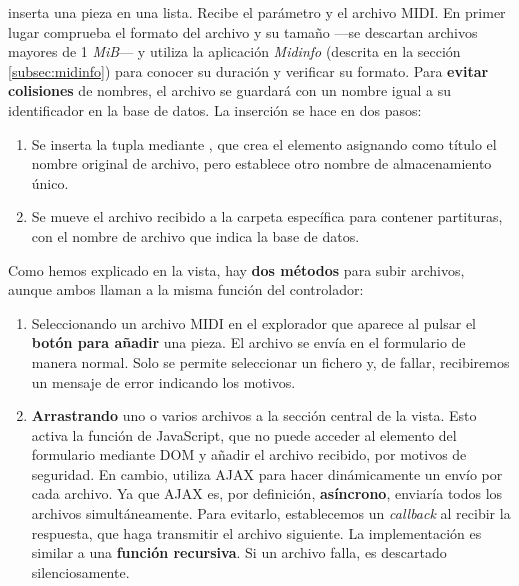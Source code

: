  inserta una pieza en una lista. Recibe el parámetro  y el archivo \acrshort{MIDI}. En primer lugar comprueba el formato del archivo y su tamaño ---se descartan archivos mayores de 1 \textit{MiB}--- y utiliza la aplicación \textit{Midinfo} (descrita en la sección \ref{subsec:midinfo}) para conocer su duración y verificar su formato. Para \textbf{evitar colisiones} de nombres, el archivo se guardará con un nombre igual a su identificador en la base de datos. La inserción se hace en dos pasos:

\begin{enumerate}
	\item Se inserta la tupla mediante , que crea el elemento asignando como título el nombre original de archivo, pero establece otro nombre de almacenamiento único.
	
	\item Se mueve el archivo recibido a la carpeta específica para contener partituras, con el nombre de archivo que indica la base de datos.
\end{enumerate}

Como hemos explicado en la vista, hay \textbf{dos métodos} para subir archivos, aunque ambos llaman a la misma función del controlador:

\begin{enumerate}
	\item Seleccionando un archivo \acrshort{MIDI} en el explorador que aparece al pulsar el\textbf{ botón para añadir} una pieza. El archivo se envía en el formulario de manera normal. Solo se permite seleccionar un fichero y, de fallar, recibiremos un mensaje de error indicando los motivos.
	
	\item \textbf{Arrastrando} uno o varios archivos a la sección central de la vista. Esto activa la función  de JavaScript, que no puede acceder al elemento  del formulario mediante \acrshort{DOM} y añadir el archivo recibido, por motivos de seguridad. En cambio, utiliza \acrshort{AJAX} para hacer dinámicamente un envío por cada archivo. Ya que \acrshort{AJAX} es, por definición, \textbf{asíncrono}, enviaría todos los archivos simultáneamente. Para evitarlo, establecemos un \textit{callback} al recibir la respuesta, que haga transmitir el archivo siguiente. La implementación es similar a una \textbf{función recursiva}. Si un archivo falla, es descartado silenciosamente.
\end{enumerate}

